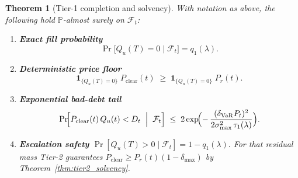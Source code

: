 \documentclass[11pt]{article}
\newtheorem{theorem}{Theorem}[section]
\begin{document}
\begin{theorem}[Tier-1 completion and solvency]
\label{thm:tier1-completion}
With notation as above, the following hold $\mathbb P$-almost surely
on $\mathcal F_t$:

\begin{enumerate}
\item[(i)] \textbf{Exact fill probability}
      \[
         \Pr\bigl[Q_u(T)=0\mid\mathcal F_t\bigr] = q_1(\lambda).
      \]

\item[(ii)] \textbf{Deterministic price floor}
      \[
         \mathbf 1_{\{Q_u(T)=0\}}
            \;P_{\mathrm{clear}}(t)
         \;\ge\;
         \mathbf 1_{\{Q_u(T)=0\}}
            \;P_r(t).
      \]

\item[(iii)] \textbf{Exponential bad-debt tail}
      \[
         \Pr\!\Bigl[
             P_{\mathrm{clear}}(t)\,Q_u(t)<D_t
             \;\Bigm|\;\mathcal F_t
         \Bigr]
         \;\le\;
         2\exp\!\Bigl(
            -\,\frac{(\delta_{\mathrm{VaR}}P_t)^2}
                    {2\sigma_{\max}^2\,\tau_1(\lambda)}
         \Bigr).
      \]

\item[(iv)] \textbf{Escalation safety}
      \(
         \Pr[Q_u(T)>0\mid\mathcal F_t] = 1-q_1(\lambda).
      \)
      For that residual mass Tier-2 guarantees
      \(
        P_{\mathrm{clear}}\ge P_r(t)(1-\delta_{\max})
      \)
      by Theorem~\ref{thm:tier2_solvency}.
\end{enumerate}
\end{theorem}
\end{document}
